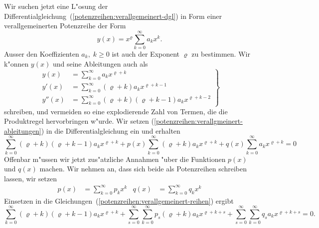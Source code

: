Wir suchen jetzt eine L"osung der
Differentialgleichung~(\ref{potenzreihen:verallgemeinert-dgl})
in Form einer verallgemeinerten Potenzreihe der Form
\begin{equation}
y(x)=x^\varrho\sum_{k=0}^\infty a_kx^k.
\label{potenzreihen:verallgemeinert}
\end{equation}
Ausser den Koeffizienten $a_k,\;k\ge 0$ ist auch der Exponent
$\varrho$ zu bestimmen.
Wir k"onnen $y(x)$ und seine Ableitungen auch als
\begin{equation}
\left.
\begin{aligned}
y(x)
&=
\sum_{k=0}^\infty a_kx^{\varrho+k}
\\
y'(x)
&=
\sum_{k=0}^\infty (\varrho+k)a_kx^{\varrho+k-1}
\\
y''(x)
&=
\sum_{k=0}^\infty (\varrho+k)(\varrho+k-1)a_kx^{\varrho+k-2}
\end{aligned}
\right\}
\label{potenzreihen:verallgemeinert-ableitungen}
\end{equation}
schreiben, und vermeiden so eine explodierende Zahl von Termen, die
die Produktregel hervorbringen w"urde.
Wir setzen (\ref{potenzreihen:verallgmeinert-ableitungen})
in die Differentialgleichung ein und erhalten
\begin{equation}
\sum_{k=0}^\infty (\varrho+k)(\varrho+k-1)a_kx^{\varrho+k}
+p(x)
\sum_{k=0}^\infty (\varrho+k)a_kx^{\varrho+k}
+q(x)
\sum_{k=0}^\infty a_kx^{\varrho+k}
=0
\label{potenzreihen:verallgemeinert-reihen}
\end{equation}
Offenbar m"ussen wir jetzt zus"atzliche Annahmen "uber die
Funktionen $p(x)$ und $q(x)$ machen.
Wir nehmen an, dass sich beide als Potenzreihen schreiben lassen,
wir setzen
\begin{align*}
p(x)&=\sum_{k=0}^\infty p_kx^k
&
q(x)&=\sum_{k=0}^\infty q_kx^k
\end{align*}
Einsetzen in die Gleichungen~(\ref{potenzreihen:verallgemeinert-reihen})
ergibt
\begin{equation}
\sum_{k=0}^\infty (\varrho+k)(\varrho+k-1)a_kx^{\varrho+k}
+\sum_{s=0}^\infty
\sum_{k=0}^\infty p_s(\varrho+k)a_kx^{\varrho+k+s}
+
\sum_{s=0}^\infty
\sum_{k=0}^\infty q_sa_kx^{\varrho+k+s}
=0.
\end{equation}


